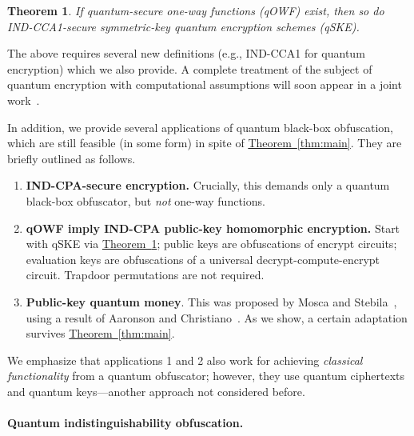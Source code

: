 \documentclass[11pt]{article}
\numberwithin{equation}{section}
\newtheorem{theorem}{Theorem}
\newcommand{\expref}[2]{\texorpdfstring{\hyperref[#2]{#1~\ref{#2}}}{#1~\ref{#2}}}
\begin{document}
{\begin{theorem}\label{thm:cca}
If quantum-secure one-way functions (qOWF) exist, then so do IND-CCA1-secure symmetric-key quantum encryption schemes (qSKE).
\end{theorem}

\noindent The above requires several new definitions (e.g., IND-CCA1 for quantum encryption) which we also provide. A complete treatment of the subject of quantum encryption with computational assumptions will soon appear in a joint work~\cite{ABFGSS15}.

In addition, we provide several applications of quantum black-box obfuscation, which are still feasible (in some form) in spite of \expref{Theorem}{thm:main}. They are briefly outlined as follows.
\begin{enumerate}
\item \textbf{IND-CPA-secure encryption.} Crucially, this demands only a quantum black-box obfuscator, but \emph{not} one-way functions.
\item \textbf{qOWF imply IND-CPA public-key homomorphic encryption.} Start with qSKE via \expref{Theorem}{thm:cca}; public keys are obfuscations of encrypt circuits; evaluation keys are obfuscations of a universal decrypt-compute-encrypt circuit. Trapdoor permutations are not required.
\item \textbf{Public-key quantum money}. This was proposed by Mosca and Stebila~\cite{MS10}, using a result of Aaronson and Christiano~\cite{Aar09, AC12}. As we show, a certain adaptation survives \expref{Theorem}{thm:main}.
\end{enumerate}
\noindent We emphasize that applications 1 and 2 also work for achieving \emph{classical functionality} from a quantum obfuscator; however, they use quantum ciphertexts and quantum keys---another approach not considered before.

\paragraph{Quantum indistinguishability obfuscation.}

}
\end{document}
